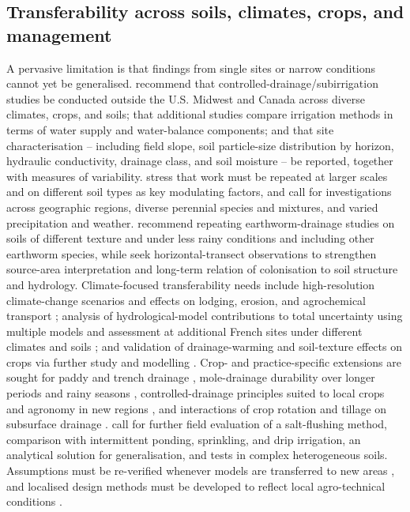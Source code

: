 \documentclass[11pt]{article}
\begin{document}
\subsection{Transferability across soils, climates, crops, and management}

A pervasive limitation is that findings from single sites or narrow conditions
cannot yet be generalised. \textcite{Singh2022b} recommend that controlled-drainage/subirrigation
studies be conducted outside the U.S. Midwest and Canada across diverse climates,
crops, and soils; that additional studies compare irrigation methods in terms of
water supply and water-balance components; and that site characterisation --
including field slope, soil particle-size distribution by horizon, hydraulic
conductivity, drainage class, and soil moisture -- be reported, together with
measures of variability. \textcite{Bilotta2008} stress that work must be repeated
at larger scales and on different soil types as key modulating factors, and
\textcite{Goeken2015} call for investigations across geographic regions, diverse
perennial species and mixtures, and varied precipitation and weather.
\textcite{Nuutinen2001} recommend repeating earthworm-drainage studies on soils of
different texture and under less rainy conditions and including other earthworm
species, while \textcite{Nuutinen2011} seek horizontal-transect observations to
strengthen source-area interpretation and long-term relation of colonisation to
soil structure and hydrology. Climate-focused transferability needs include
high-resolution climate-change scenarios and effects on lodging, erosion, and
agrochemical transport \parencite{Rasmussen2018}; analysis of hydrological-model
contributions to total uncertainty using multiple models and assessment at
additional French sites under different climates and soils \parencite{Jeantet2022};
and validation of drainage-warming and soil-texture effects on crops via further
study and modelling \parencite{Jin2008}. Crop- and practice-specific extensions
are sought for paddy and trench drainage \parencite{Rahimi2024,Jia2023},
mole-drainage durability over longer periods and rainy seasons \parencite{JHA1995},
controlled-drainage principles suited to local crops and agronomy in new regions
\parencite{Sojka2020}, and interactions of crop rotation and tillage on subsurface
drainage \parencite{Ojeda2018}. \textcite{Yu2018} call for further field
evaluation of a salt-flushing method, comparison with intermittent ponding,
sprinkling, and drip irrigation, an analytical solution for generalisation, and
tests in complex heterogeneous soils. Assumptions must be re-verified whenever
models are transferred to new areas \parencite{Kelleners2000,Youssef2006}, and
localised design methods must be developed to reflect local agro-technical
conditions \parencite{Tlapáková2017}.
\end{document}
